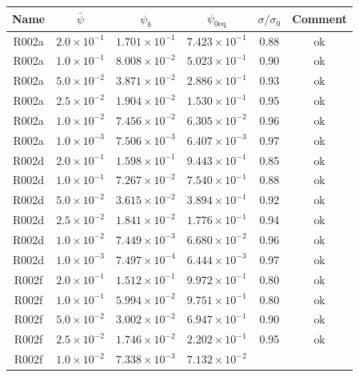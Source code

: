 \begin{table}
\begin{center}
\begin{tabular}{|c|c|c|c|c|c|}
\hline
Name & $\bar{\psi}$ & $\psi_b$ & $\psi_{0\mathrm{eq}}$
     & $\sigma / \sigma_0$  & Comment \\
\hline
R002a &  $2.0\times 10^{-1}$ & $1.701\times 10^{-1}$ & $7.423\times10^{-1}$
      & 0.88 & ok\\
R002a &  $1.0\times 10^{-1}$ & $8.008\times 10^{-2}$ & $5.023\times10^{-1}$
      & 0.90 & ok\\
R002a &  $5.0\times 10^{-2}$ & $3.871\times 10^{-2}$ & $2.886\times10^{-1}$
      & 0.93 & ok\\
R002a &  $2.5\times 10^{-2}$ & $1.904\times 10^{-2}$ & $1.530\times10^{-1}$
      & 0.95 & ok\\
R002a &  $1.0\times 10^{-2}$ & $7.456\times 10^{-2}$ & $6.305\times10^{-2}$
      & 0.96 & ok \\
R002a &  $1.0\times 10^{-3}$ & $7.506\times 10^{-3}$ & $6.407\times10^{-3}$
      & 0.97 & ok \\
\hline
R002d &  $2.0\times 10^{-1}$ & $1.598\times 10^{-1}$ & $9.443\times10^{-1}$
      & 0.85 & ok \\
R002d &  $1.0\times 10^{-1}$ & $7.267\times 10^{-2}$ & $7.540\times10^{-1}$
      & 0.88 & ok \\
R002d &  $5.0\times 10^{-2}$ & $3.615\times 10^{-2}$ & $3.894\times10^{-1}$
      & 0.92 & ok \\
R002d &  $2.5\times 10^{-2}$ & $1.841\times 10^{-2}$ & $1.776\times10^{-1}$
      & 0.94 & ok \\
R002d &  $1.0\times 10^{-2}$ & $7.449\times 10^{-3}$ & $6.680\times10^{-2}$
      & 0.96 & ok \\
R002d &  $1.0\times 10^{-3}$ & $7.497\times 10^{-4}$ & $6.444\times10^{-3}$
      & 0.97 & ok \\
\hline
R002f &  $2.0\times 10^{-1}$ & $1.512\times 10^{-1}$ & $9.972\times10^{-1}$
      & 0.80 &  ok\\
R002f &  $1.0\times 10^{-1}$ & $5.994\times 10^{-2}$ & $9.751\times10^{-1}$
      & 0.80 & ok \\
R002f &  $5.0\times 10^{-2}$ & $3.002\times 10^{-2}$ & $6.947\times10^{-1}$
      & 0.90 & ok \\
R002f &  $2.5\times 10^{-2}$ & $1.746\times 10^{-2}$ & $2.202\times10^{-1}$
      & 0.95 & ok \\
R002f &  $1.0\times 10^{-2}$ & $7.338\times 10^{-3}$ & $7.132\times10^{-2}$

\end{tabular}
\end{center}
\end{table}
